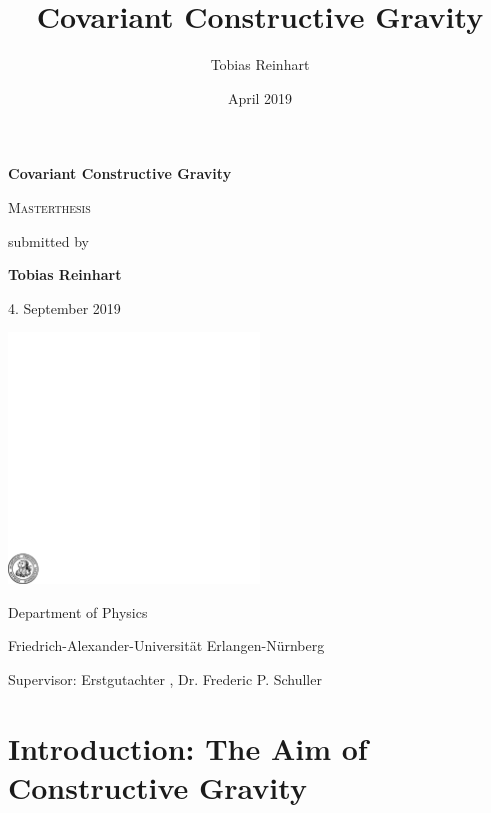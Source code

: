 \documentclass[a4paper,12pt, DIV=14, BCOR=5mm, twoside, headsepline]{scrbook}
\title{Covariant Constructive Gravity}
\author{Tobias Reinhart }
\date{April 2019}
\begin{document}
 
\begin{titlepage}
	\centering

	{\Huge\bfseries Covariant Constructive Gravity\par}
	\vspace{2cm}
	
	{\scshape\Large Masterthesis \par}
	\vspace{1cm}
	{ submitted by \par}
	
	
	
	{\bfseries Tobias Reinhart\par}
		{ 4. September 2019\par}
	\vspace{2cm}
	
	\includegraphics[width=0.5\textwidth]{fau-siegel.pdf}\par
	\vspace{1cm}Department of Physics\par
	Friedrich-Alexander-Universität Erlangen-Nürnberg\par
	Supervisor: Erstgutachter , Dr. Frederic P. Schuller
	
	\vfill





\end{titlepage}

\tableofcontents

\chapter{Introduction: The Aim of Constructive Gravity}

\end{document}
